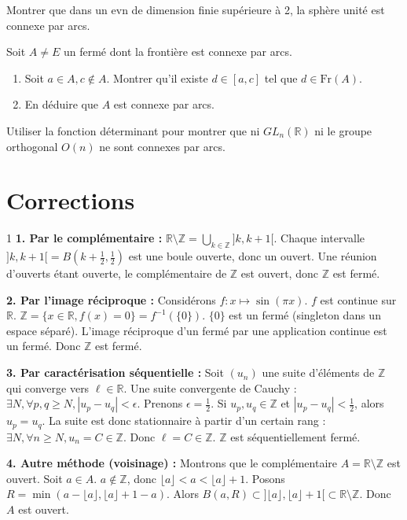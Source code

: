 \begin{exercice}
Montrer que dans un evn de dimension finie supérieure à 2, la sphère unité est connexe par arcs.
\end{exercice}

\begin{exercice}
Soit $A \neq E$ un fermé dont la frontière est connexe par arcs.
\begin{enumerate}
    \item Soit $a \in A, c \notin A$. Montrer qu'il existe $d \in [a,c]$ tel que $d \in \text{Fr}(A)$.
    \item En déduire que $A$ est connexe par arcs.
\end{enumerate}
\end{exercice}

\begin{exercice}
Utiliser la fonction déterminant pour montrer que ni $GL_{n}(\mathbb{R})$ ni le groupe orthogonal $O(n)$ ne sont connexes par arcs.
\end{exercice}

\newpage
\section{Corrections}

\begin{correction}{1}
\textbf{1. Par le complémentaire :}
$\mathbb{R} \setminus \mathbb{Z} = \bigcup_{k \in \mathbb{Z}} ]k, k+1[$.
Chaque intervalle $]k, k+1[ = B(k+\frac{1}{2}, \frac{1}{2})$ est une boule ouverte, donc un ouvert.
Une réunion d'ouverts étant ouverte, le complémentaire de $\mathbb{Z}$ est ouvert, donc $\mathbb{Z}$ est fermé.

\textbf{2. Par l'image réciproque :}
Considérons $f : x \mapsto \sin(\pi x)$.
$f$ est continue sur $\mathbb{R}$.
$\mathbb{Z} = \{ x \in \mathbb{R}, f(x)=0 \} = f^{-1}(\{0\})$.
$\{0\}$ est un fermé (singleton dans un espace séparé). L'image réciproque d'un fermé par une application continue est un fermé. Donc $\mathbb{Z}$ est fermé.

\textbf{3. Par caractérisation séquentielle :}
Soit $(u_{n})$ une suite d'éléments de $\mathbb{Z}$ qui converge vers $\ell \in \mathbb{R}$.
Une suite convergente de Cauchy : $\exists N, \forall p,q \ge N, |u_{p} - u_{q}| < \epsilon$.
Prenons $\epsilon = \frac{1}{2}$.
Si $u_{p}, u_{q} \in \mathbb{Z}$ et $|u_{p} - u_{q}| < \frac{1}{2}$, alors $u_{p} = u_{q}$.
La suite est donc stationnaire à partir d'un certain rang : $\exists N, \forall n \ge N, u_{n} = C \in \mathbb{Z}$.
Donc $\ell = C \in \mathbb{Z}$. $\mathbb{Z}$ est séquentiellement fermé.

\textbf{4. Autre méthode (voisinage) :}
Montrons que le complémentaire $A = \mathbb{R} \setminus \mathbb{Z}$ est ouvert.
Soit $a \in A$. $a \notin \mathbb{Z}$, donc $\lfloor a \rfloor < a < \lfloor a \rfloor + 1$.
Posons $R = \min(a - \lfloor a \rfloor, \lfloor a \rfloor + 1 - a)$.
Alors $B(a, R) \subset ]\lfloor a \rfloor, \lfloor a \rfloor + 1[ \subset \mathbb{R} \setminus \mathbb{Z}$.
Donc $A$ est ouvert.
\end{correction}

